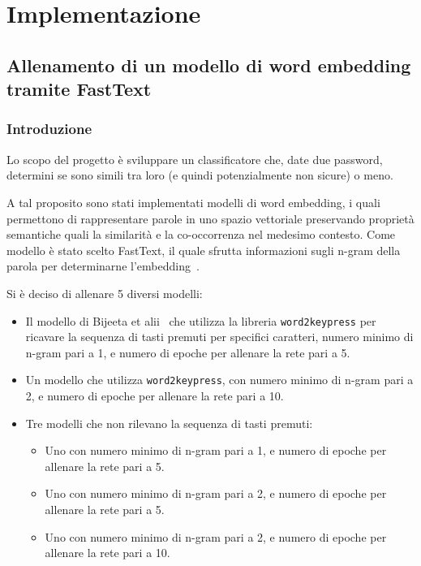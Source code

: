 \chapter{Implementazione}
\label{ch:implementazione}
\section{Allenamento di un modello di word embedding tramite FastText}
\subsection{Introduzione}
Lo scopo del progetto è sviluppare un classificatore che, date due password, determini se sono simili tra loro (e quindi potenzialmente non sicure) o meno.

A tal proposito sono stati implementati modelli di word embedding, i quali permettono di rappresentare parole in uno spazio vettoriale preservando proprietà semantiche quali la similarità e la co-occorrenza nel medesimo contesto.
Come modello è stato scelto FastText, il quale sfrutta informazioni sugli n-gram della parola per determinarne l'embedding~\cite{biijeta}.

Si è deciso di allenare 5 diversi modelli:
\begin{itemize}
    \item Il modello di Bijeeta et alii~\cite{biijeta} che utilizza la libreria \texttt{word2keypress} per ricavare la sequenza di tasti premuti per specifici caratteri, numero minimo di n-gram pari a 1, e numero di epoche per allenare la rete pari a 5.
    \item Un modello che utilizza \texttt{word2keypress}, con numero minimo di n-gram pari a 2, e numero di epoche per allenare la rete pari a 10.
    \item Tre modelli che non rilevano la sequenza di tasti premuti:
    \begin{itemize}
        \item Uno con numero minimo di n-gram pari a 1, e numero di epoche per allenare la rete pari a 5.
        \item Uno con numero minimo di n-gram pari a 2, e numero di epoche per allenare la rete pari a 5.
        \item Uno con numero minimo di n-gram pari a 2, e numero di epoche per allenare la rete pari a 10.
    \end{itemize}
\end{itemize}

